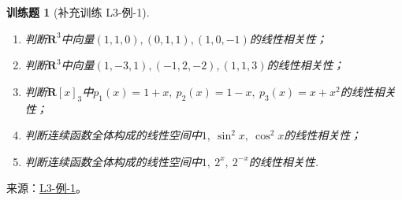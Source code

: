 \documentclass[12pt,fontset=fandol]{ctexart}
\newtheorem{exercise}{训练题}[section]
\begin{document}
\begin{exercise}[补充训练 L3-例-1]\label{prob:L3-例-1}
\begin{enumerate}[label=(\arabic*)]
        \item 判断$\mathbf{R}^3$中向量$(1,1,0),(0,1,1),(1,0,-1)$的线性相关性；

        \item 判断$\mathbf{R}^3$中向量$(1,-3,1),(-1,2,-2),(1,1,3)$的线性相关性；

        \item \label{item:3:线性相关性:3}
              判断$\mathbf{R}[x]_3$中$p_1(x)=1+x,\ p_2(x)=1-x,\ p_3(x)=x+x^2$的线性相关性；

        \item 判断连续函数全体构成的线性空间中$1,\ \sin^2x,\ \cos^2x$的线性相关性；

        \item \label{item:3:线性相关性:5}
              判断连续函数全体构成的线性空间中$1,\ 2^x,\ 2^{-x}$的线性相关性.
    \end{enumerate}
\end{exercise}
\noindent 来源：\href{https://github.com/yhwu-is/Linear-Algebra-Left-Undone/blob/new/%E8%AE%B2%E4%B9%89/%E4%B8%93%E9%A2%98/3%20%E6%9C%89%E9%99%90%E7%BB%B4%E7%BA%BF%E6%80%A7%E7%A9%BA%E9%97%B4.tex}{L3-例-1}。
\end{document}

